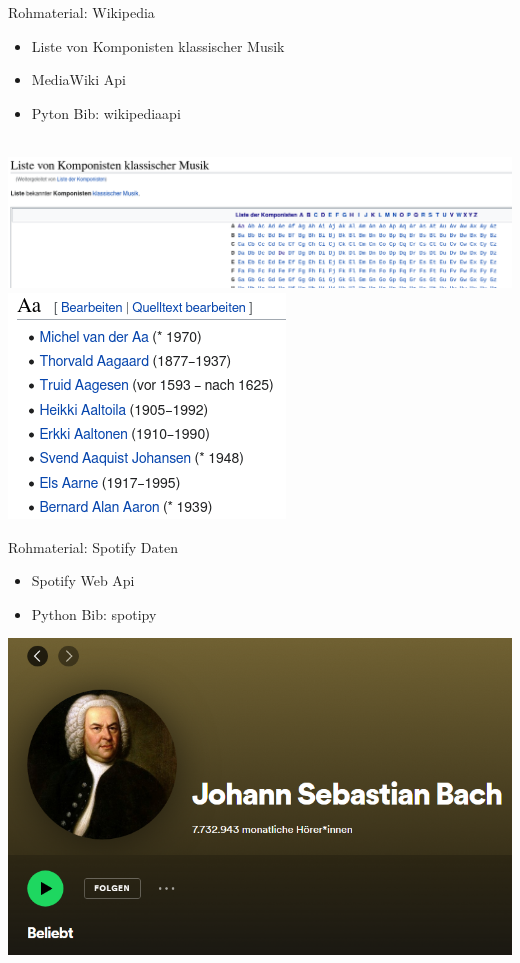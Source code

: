 \documentclass[aspectratio=169]{beamer}
\begin{document}
\begin{frame}{Rohmaterial: Wikipedia}
	\begin{itemize}
		\item \glqq Liste von Komponisten klassischer Musik\grqq
		\item MediaWiki Api
		\item Pyton Bib: wikipediaapi
	\end{itemize}
~\\
	\includegraphics[scale=.21]{"data/wikiKomponistenListe.png"}
	\includegraphics[scale=.3]{"data/wikiKomponistenA.png"}
\end{frame}
\begin{frame}{Rohmaterial: Spotify Daten}
	\begin{itemize}
		\item Spotify Web Api
		\item Python Bib: spotipy
	\end{itemize}
	\includegraphics[scale=.4]{"data/spotifyscreenshot.png"}
\end{frame}
\end{document}

